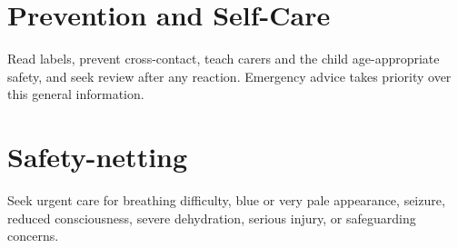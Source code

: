 \section*{Prevention and Self-Care}
Read labels, prevent cross-contact, teach carers and the child age-appropriate safety, and seek review after any reaction. Emergency advice takes priority over this general information.
\section*{Safety-netting}
Seek urgent care for breathing difficulty, blue or very pale appearance, seizure, reduced consciousness, severe dehydration, serious injury, or safeguarding concerns.
